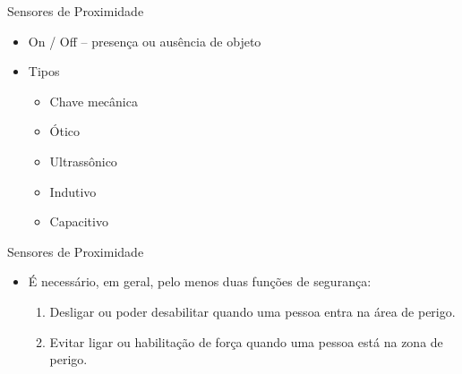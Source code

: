 \documentclass[aspectratio=169,
				xcolor=table]{beamer}
\begin{document}
		\begin{frame}{Sensores de Proximidade}
			\begin{itemize}
				\item On / Off – presença ou ausência de objeto
	
				\item Tipos
				\begin{itemize}
					\item Chave mecânica
					\item Ótico
					\item Ultrassônico
					\item Indutivo
					\item Capacitivo			
				\end{itemize}
			\end{itemize}				
		\end{frame}
		
		\begin{frame}{Sensores de Proximidade}
			\begin{itemize}
				\item É necessário, em geral, pelo menos duas funções de segurança:
				\begin{enumerate}
					\item Desligar ou poder desabilitar quando uma pessoa entra na área de perigo.	
					\item Evitar ligar ou habilitação de força quando uma pessoa está na zona de perigo.
					
				\end{enumerate}
			\end{itemize}
		\end{frame}
		
\end{document}
